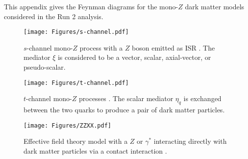 \label{chapter:appendix}

This appendix gives the Feynman diagrams for the mono-$Z$ dark matter models considered in the Run 2 analysis.

\begin{figure}[h]
\centering
\texttt{[image: Figures/s-channel.pdf]}
\caption[$s$-channel mono-$Z$ process with a $Z$ boson emitted as ISR]{$s$-channel mono-$Z$ process with a $Z$ boson emitted as ISR \cite{Barberioa}. The mediator $\xi$ is considered to be a vector, scalar, axial-vector, or pseudo-scalar.}
\label{fig:schannel}
\end{figure}

\begin{figure}[h]
\centering
\texttt{[image: Figures/t-channel.pdf]}
\caption[$t$-channel mono-$Z$ processes]{$t$-channel mono-$Z$ processes \cite{Bell:2012rg}. The scalar mediator $\eta_q$ is exchanged between the two quarks to produce a pair of dark matter particles.}
\label{fig:tchannel}
\end{figure}

\begin{figure}[h]
\centering
\texttt{[image: Figures/ZZXX.pdf]}
\caption[Effective field theory model with a $Z$ or $\gamma^*$ interacting directly with dark matter particles via a contact interaction]{Effective field theory model with a $Z$ or $\gamma^*$ interacting directly with dark matter particles via a contact interaction \cite{Aad:2014vka}.}
\label{fig:ZZXX}
\end{figure}
